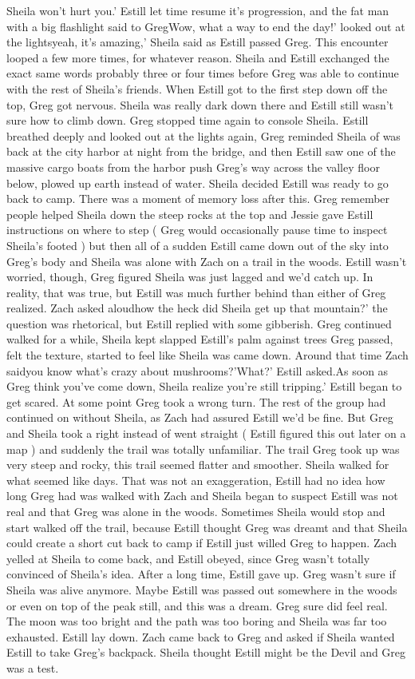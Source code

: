\documentclass[12pt]{book}
\begin{document}
Sheila won't hurt you.' Estill let time resume it's progression, and the fat man with a big flashlight said to GregWow, what a way to end the day!' looked out at the lightsyeah, it's amazing,' Sheila said as Estill passed Greg. This encounter looped a few more times, for whatever reason. Sheila and Estill exchanged the exact same words probably three or four times before Greg was able to continue with the rest of Sheila's friends. When Estill got to the first step down off the top, Greg got nervous. Sheila was really dark down there and Estill still wasn't sure how to climb down. Greg stopped time again to console Sheila. Estill breathed deeply and looked out at the lights again, Greg reminded Sheila of was back at the city harbor at night from the bridge, and then Estill saw one of the massive cargo boats from the harbor push Greg's way across the valley floor below, plowed up earth instead of water. Sheila decided Estill was ready to go back to camp. There was a moment of memory loss after this. Greg remember people helped Sheila down the steep rocks at the top and Jessie gave Estill instructions on where to step ( Greg would occasionally pause time to inspect Sheila's footed ) but then all of a sudden Estill came down out of the sky into Greg's body and Sheila was alone with Zach on a trail in the woods. Estill wasn't worried, though, Greg figured Sheila was just lagged and we'd catch up. In reality, that was true, but Estill was much further behind than either of Greg realized. Zach asked aloudhow the heck did Sheila get up that mountain?' the question was rhetorical, but Estill replied with some gibberish. Greg continued walked for a while, Sheila kept slapped Estill's palm against trees Greg passed, felt the texture, started to feel like Sheila was came down. Around that time Zach saidyou know what's crazy about mushrooms?'What?' Estill asked.As soon as Greg think you've come down, Sheila realize you're still tripping.' Estill began to get scared. At some point Greg took a wrong turn. The rest of the group had continued on without Sheila, as Zach had assured Estill we'd be fine. But Greg and Sheila took a right instead of went straight ( Estill figured this out later on a map ) and suddenly the trail was totally unfamiliar. The trail Greg took up was very steep and rocky, this trail seemed flatter and smoother. Sheila walked for what seemed like days. That was not an exaggeration, Estill had no idea how long Greg had was walked with Zach and Sheila began to suspect Estill was not real and that Greg was alone in the woods. Sometimes Sheila would stop and start walked off the trail, because Estill thought Greg was dreamt and that Sheila could create a short cut back to camp if Estill just willed Greg to happen. Zach yelled at Sheila to come back, and Estill obeyed, since Greg wasn't totally convinced of Sheila's idea. After a long time, Estill gave up. Greg wasn't sure if Sheila was alive anymore. Maybe Estill was passed out somewhere in the woods or even on top of the peak still, and this was a dream. Greg sure did feel real. The moon was too bright and the path was too boring and Sheila was far too exhausted. Estill lay down. Zach came back to Greg and asked if Sheila wanted Estill to take Greg's backpack. Sheila thought Estill might be the Devil and Greg was a test. 
\end{document}
